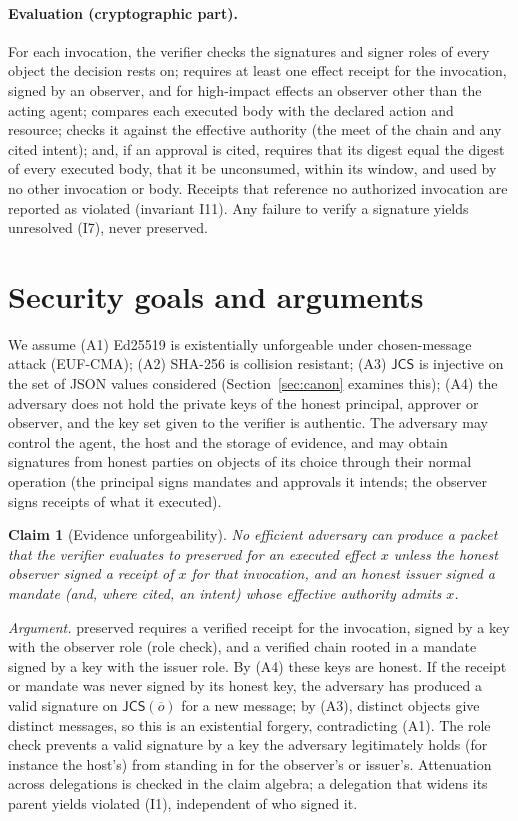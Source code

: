 \documentclass[11pt,a4paper]{article}
\newtheorem{claim}{Claim}
\theoremstyle{definition}
\theoremstyle{remark}
\newcommand{\pres}{\textsf{preserved}}
\newcommand{\viol}{\textsf{violated}}
\newcommand{\unres}{\textsf{unresolved}}
\newcommand{\Canon}{\mathsf{JCS}}
\begin{document}
\paragraph{Evaluation (cryptographic part).} For each invocation, the verifier checks the signatures and signer roles of every object the decision rests on; requires at least one effect receipt for the invocation, signed by an observer, and for high-impact effects an observer other than the acting agent; compares each executed body with the declared action and resource; checks it against the effective authority (the meet of the chain and any cited intent); and, if an approval is cited, requires that its digest equal the digest of every executed body, that it be unconsumed, within its window, and used by no other invocation or body. Receipts that reference no authorized invocation are reported as \viol{} (invariant I11). Any failure to verify a signature yields \unres{} (I7), never \pres{}.

\section{Security goals and arguments}\label{sec:security}

We assume (A1) Ed25519 is existentially unforgeable under chosen-message attack (EUF-CMA); (A2) SHA-256 is collision resistant; (A3) $\Canon$ is injective on the set of JSON values considered (Section~\ref{sec:canon} examines this); (A4) the adversary does not hold the private keys of the honest principal, approver or observer, and the key set given to the verifier is authentic. The adversary may control the agent, the host and the storage of evidence, and may obtain signatures from honest parties on objects of its choice through their normal operation (the principal signs mandates and approvals it intends; the observer signs receipts of what it executed).

\begin{claim}[Evidence unforgeability]\label{c:unforge}
No efficient adversary can produce a packet that the verifier evaluates to \pres{} for an executed effect $x$ unless the honest observer signed a receipt of $x$ for that invocation, and an honest issuer signed a mandate (and, where cited, an intent) whose effective authority admits $x$.
\end{claim}
\emph{Argument.} \pres{} requires a verified receipt for the invocation, signed by a key with the observer role (role check), and a verified chain rooted in a mandate signed by a key with the issuer role. By (A4) these keys are honest. If the receipt or mandate was never signed by its honest key, the adversary has produced a valid signature on $\Canon(\overline{o})$ for a new message; by (A3), distinct objects give distinct messages, so this is an existential forgery, contradicting (A1). The role check prevents a valid signature by a key the adversary legitimately holds (for instance the host's) from standing in for the observer's or issuer's. Attenuation across delegations is checked in the claim algebra; a delegation that widens its parent yields \viol{} (I1), independent of who signed it.
\end{document}
